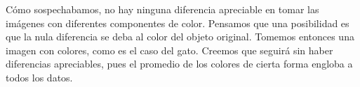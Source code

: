 


Cómo sospechabamos, no hay ninguna diferencia apreciable en tomar las imágenes con diferentes componentes de color. Pensamos que una posibilidad es que la nula diferencia se deba al color del objeto original. Tomemos entonces una imagen con colores, como es el caso del gato. Creemos que seguirá sin haber diferencias apreciables, pues el promedio de los colores de cierta forma engloba a todos los datos. \\


